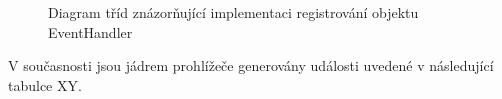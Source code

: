\begin{figure}[H]
  \begin{center}
    \caption{Diagram tříd znázorňující implementaci registrování objektu EventHandler}
    \label{Figure.EventHandlerEventListener}
  \end{center}
\end{figure}

V současnosti jsou jádrem prohlížeče generovány události uvedené v následující tabulce XY.

